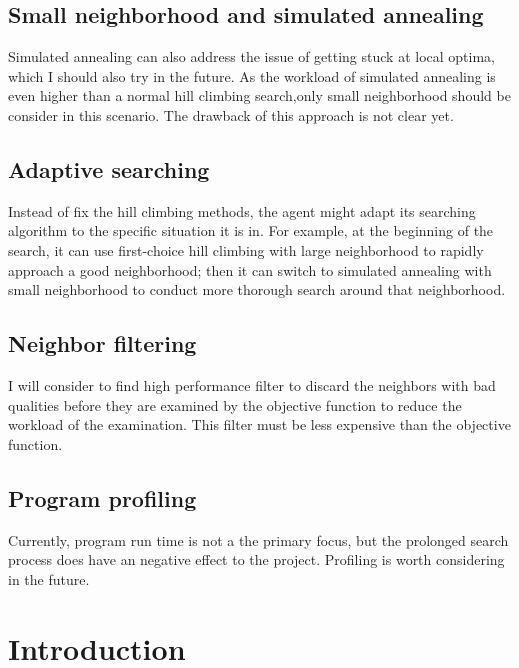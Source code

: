 \documentclass[12pt]{article}
\theoremstyle{definition}
\begin{document}
\subsection{Small neighborhood and simulated annealing}
Simulated annealing can also address the issue of getting stuck at local optima, which I should also try in the future. As the workload of simulated annealing is even higher than a normal hill climbing search,only small neighborhood should be consider in this scenario. The drawback of this approach is not clear yet.
\subsection{Adaptive searching}
Instead of fix the hill climbing methods, the agent might adapt its searching algorithm to the specific situation it is in. For example, at the beginning of the search, it can use first-choice hill climbing with large neighborhood to rapidly approach a good neighborhood; then it can switch to simulated annealing with small neighborhood to conduct more thorough search around that neighborhood.
\subsection{Neighbor filtering}
I will consider to find high performance filter to discard the neighbors with bad qualities before they are examined by the objective function to reduce the workload of the examination. This filter must be less expensive than the objective function.
\subsection{Program profiling}
Currently, program run time is not a the primary focus, but the prolonged search process does have an negative effect to the project. Profiling is worth considering in the future.

\section{Introduction}
\end{document}
